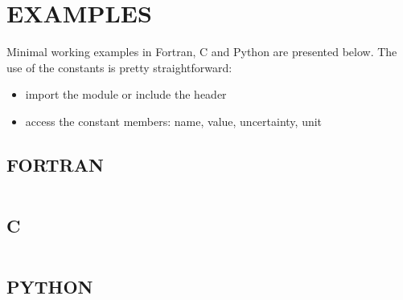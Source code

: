 \chapter{EXAMPLES}

Minimal working examples in Fortran, C and Python are presented below.
The use of the constants is pretty straightforward:
\begin{itemize}
    \item import the module or include the header
    \item access the constant members: name, value, uncertainty, unit
\end{itemize}

\section*{FORTRAN}
\inputminted{Fortran}{../../../example/example.f90}

\section*{C}
\inputminted{c}{../../../example/example.c}

\section*{PYTHON}
\inputminted{python}{../../../example/example.py}
